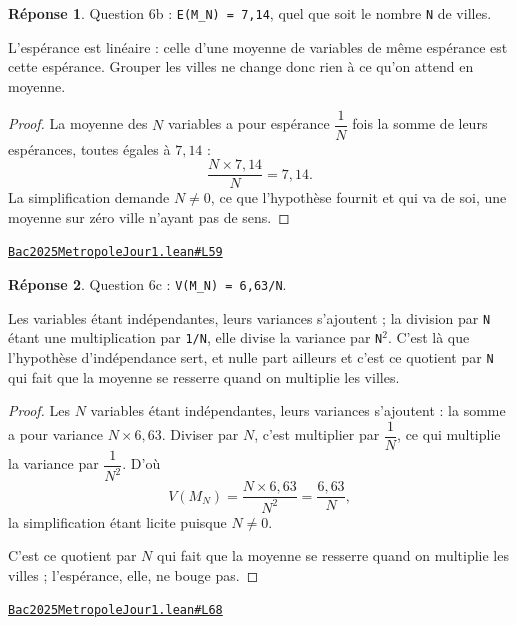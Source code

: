 \documentclass[11pt,a4paper]{article}
\theoremstyle{definition}
\theoremstyle{plain}
\theoremstyle{definition}
\newtheorem*{reponse}{Réponse}
\newcommand{\source}[2]{\par\smallskip\noindent\hfill{\footnotesize\href{#1}{\texttt{#2}}}\par\smallskip}
\begin{document}
\begin{reponse}
Question 6b : \texttt{E(M\_N) = 7,14}, quel que soit le nombre \texttt{N} de villes.

L'espérance est linéaire : celle d'une moyenne de variables de même espérance est
cette espérance. Grouper les villes ne change donc rien à ce qu'on attend en
moyenne.
\end{reponse}
\begin{proof}
La moyenne des $N$ variables a pour espérance $\dfrac{1}{N}$ fois la somme de leurs
espérances, toutes égales à $7{,}14$ :
\[ \frac{N \times 7{,}14}{N} = 7{,}14 . \]
La simplification demande $N \ne 0$, ce que l'hypothèse fournit \textemdash{} et qui va de
soi, une moyenne sur zéro ville n'ayant pas de sens.
\end{proof}
\source{https://github.com/Commutator-IO/learn-lean/blob/main/exams/2025/Bac2025MetropoleJour1.lean\#L59}{Bac2025MetropoleJour1.lean\#L59}

\begin{reponse}
Question 6c : \texttt{V(M\_N) = 6,63/N}.

Les variables étant indépendantes, leurs variances s'ajoutent ; la division par \texttt{N}
étant une multiplication par \texttt{1/N}, elle divise la variance par \texttt{N\(^{2}\)}. C'est là que
l'hypothèse d'indépendance sert, et nulle part ailleurs \textemdash{} et c'est ce quotient par
\texttt{N} qui fait que la moyenne se resserre quand on multiplie les villes.
\end{reponse}
\begin{proof}
Les $N$ variables étant indépendantes, leurs variances s'ajoutent : la somme a pour
variance $N \times 6{,}63$. Diviser par $N$, c'est multiplier par $\dfrac{1}{N}$, ce qui
multiplie la variance par $\dfrac{1}{N^2}$. D'où
\[ V(M_N) = \frac{N \times 6{,}63}{N^2} = \frac{6{,}63}{N} , \]
la simplification étant licite puisque $N \ne 0$.

C'est ce quotient par $N$ qui fait que la moyenne se resserre quand on multiplie les
villes ; l'espérance, elle, ne bouge pas.
\end{proof}
\source{https://github.com/Commutator-IO/learn-lean/blob/main/exams/2025/Bac2025MetropoleJour1.lean\#L68}{Bac2025MetropoleJour1.lean\#L68}
\end{document}
